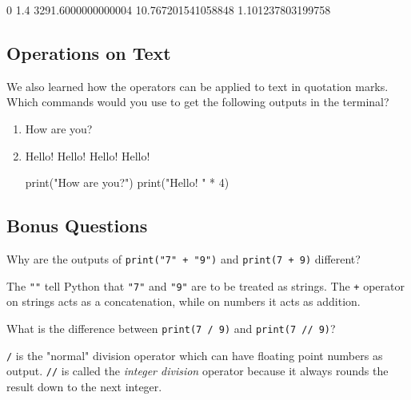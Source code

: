 \begin{solution}
    \begin{outputcode}
0
1.4
3291.6000000000004
10.767201541058848
1.101237803199758
    \end{outputcode}
\end{solution}

\subsection{Operations on Text}

We also learned how the operators can be applied to text in quotation marks.
Which commands would you use to get the following outputs in the terminal?

\begin{enumerate}

\item How are you?
\item Hello! Hello! Hello! Hello!

\begin{solution}
    \begin{pythoncode}
print("How are you?")
print("Hello! " * 4)
    \end{pythoncode}
\end{solution}

\end{enumerate}

\subsection{Bonus Questions}

Why are the outputs of \texttt{print("7" + "9")} and \texttt{print(7 + 9)} different?

\vspace {1em}

\begin{solution}
    The \texttt{""} tell Python that \texttt{"7"} and \texttt{"9"} are to be treated as strings. The \texttt{+} operator on strings acts as a concatenation, while on numbers it acts as addition.
\end{solution}

\vspace{1em}

\noindent What is the difference between \texttt{print(7 / 9)} and \texttt{print(7 // 9)}?

\begin{solution}
    \texttt{/} is the "normal" division operator which can have floating point numbers as output. \texttt{//} is called the \textit{integer division} operator because it always rounds the result down to the next integer.
\end{solution}

